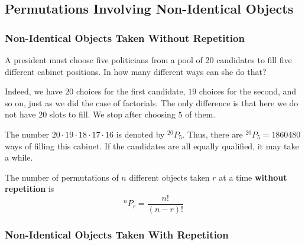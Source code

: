 \documentclass[11pt,a4paper]{book}
\begin{document}
\subsection{Permutations Involving Non-Identical Objects}

\subsubsection{Non-Identical Objects Taken Without Repetition}

\begin{example}

A president must choose five politicians from a pool of 20 candidates
to fill five different cabinet positions. In how many different ways
can she do that?

\Solution

Indeed, we have $20$ choices for the first candidate, $19$ choices
for the second, and so on, just as we did the case of factorials.
The only difference is that here we do not have $20$ slots to fill.
We stop after choosing $5$ of them.

The number $20\cdot19\cdot18\cdot17\cdot16$ is denoted by $^{20}P_{5}$.
Thus, there are $^{20}P_{5}=1860480$ ways of filling this cabinet.
If the candidates are all equally qualified, it may take a while.

\end{example}

\medskip{}

\begin{tcolorbox}[colback=blue!5, colframe=black, boxrule=.4pt, sharpish corners]

The number of permutations of $n$ different objects taken $r$ at
a time \textbf{without repetition} is
\[
^{n}P_{r}=\frac{n!}{\left(n-r\right)!}
\]
\end{tcolorbox}


\subsubsection{Non-Identical Objects Taken With Repetition}
\end{document}
